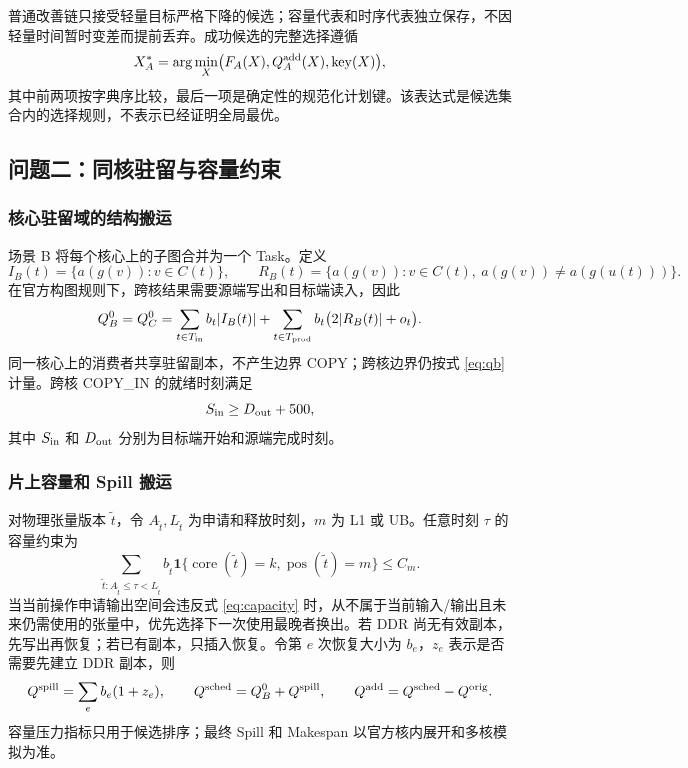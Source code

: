 普通改善链只接受轻量目标严格下降的候选；容量代表和时序代表独立保存，不因轻量时间暂时变差而提前丢弃。成功候选的完整选择遵循
\begin{equation}
X_A^*=\arg\min_X\bigl(F_A(X),Q_A^{\rm add}(X),\operatorname{key}(X)\bigr),
\end{equation}
其中前两项按字典序比较，最后一项是确定性的规范化计划键。该表达式是候选集合内的选择规则，不表示已经证明全局最优。

\subsection{问题二：同核驻留与容量约束}
\subsubsection{核心驻留域的结构搬运}
场景 B 将每个核心上的子图合并为一个 Task。定义
\begin{equation}
I_B(t)=\{a(g(v)):v\in C(t)\},\qquad
R_B(t)=\{a(g(v)):v\in C(t),\ a(g(v))\ne a(g(u(t)))\}.
\end{equation}
在官方构图规则下，跨核结果需要源端写出和目标端读入，因此
\begin{equation}\label{eq:qb}
Q_B^0=Q_C^0=\sum_{t\in T_{\rm in}}b_t|I_B(t)|+
\sum_{t\in T_{\rm prod}}b_t\bigl(2|R_B(t)|+o_t\bigr).
\end{equation}
同一核心上的消费者共享驻留副本，不产生边界 COPY；跨核边界仍按式 \eqref{eq:qb} 计量。跨核 COPY\_IN 的就绪时刻满足
\begin{equation}
S_{\rm in}\ge D_{\rm out}+500,
\end{equation}
其中 $S_{\rm in}$ 和 $D_{\rm out}$ 分别为目标端开始和源端完成时刻。

\subsubsection{片上容量和 Spill 搬运}
对物理张量版本 $\tilde t$，令 $A_{\tilde t},L_{\tilde t}$ 为申请和释放时刻，$m$ 为 L1 或 UB。任意时刻 $\tau$ 的容量约束为
\begin{equation}\label{eq:capacity}
\sum_{\tilde t:A_{\tilde t}\le\tau<L_{\tilde t}}
b_{\tilde t}\mathbf 1\{\operatorname{core}(\tilde t)=k,\operatorname{pos}(\tilde t)=m\}
\le C_m.
\end{equation}
当当前操作申请输出空间会违反式 \eqref{eq:capacity} 时，从不属于当前输入/输出且未来仍需使用的张量中，优先选择下一次使用最晚者换出。若 DDR 尚无有效副本，先写出再恢复；若已有副本，只插入恢复。令第 $e$ 次恢复大小为 $b_e$，$z_e$ 表示是否需要先建立 DDR 副本，则
\begin{equation}
Q^{\rm spill}=\sum_e b_e(1+z_e),\qquad
Q^{\rm sched}=Q_B^0+Q^{\rm spill},\qquad
Q^{\rm add}=Q^{\rm sched}-Q^{\rm orig}.
\end{equation}
容量压力指标只用于候选排序；最终 Spill 和 Makespan 以官方核内展开和多核模拟为准。

